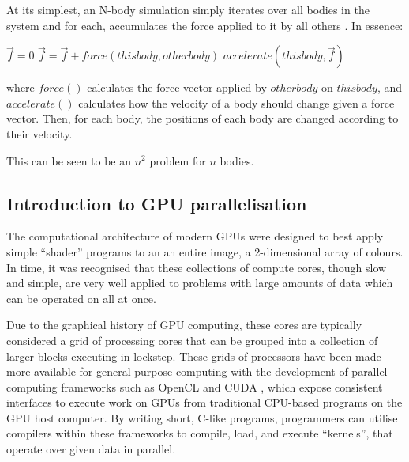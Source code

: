 \documentclass[journal,transmag]{IEEEtran}
\begin{document}
        At its simplest, an N-body simulation simply iterates over all bodies in the system and for each, accumulates
        the force applied to it by all others \cite{frans}. In essence:

        \begin{algorithmic}
                \STATE $ \vec{f} = 0 $
                    \STATE $ \vec{f} = \vec{f} + force(thisbody, otherbody) $
                \ENDFOR
                \STATE $ accelerate(thisbody, \vec{f}) $
            \ENDFOR
        \end{algorithmic}

        where $ force() $ calculates the force vector applied by $ otherbody $ on $ thisbody $, and $ accelerate() $
        calculates how the velocity of a body should change given a force vector. Then, for each body, the positions
        of each body are changed according to their velocity.

        This can be seen to be an $ n^2 $ problem for $ n $ bodies.

        \subsection{Introduction to GPU parallelisation}
        The computational architecture of modern GPUs were designed to best apply simple ``shader'' programs to an
        an entire image, a 2-dimensional array of colours. In time, it was recognised that these collections of compute
        cores, though slow and simple, are very well applied to problems with large amounts of data which can be
        operated on all at once.

        Due to the graphical history of GPU computing, these cores are typically considered a grid of processing cores
        that can be grouped into a collection of larger blocks executing in lockstep. These grids of processors have
        been made more available for general purpose computing with the development of parallel computing frameworks
        such as OpenCL \cite{OpenCL} and CUDA \cite{CUDA}, which expose consistent interfaces to execute work on GPUs from traditional
        CPU-based programs on the GPU host computer. By writing short, C-like programs, programmers can utilise
        compilers within these frameworks to compile, load, and execute ``kernels'', that operate over given data in
        parallel.
\end{document}
